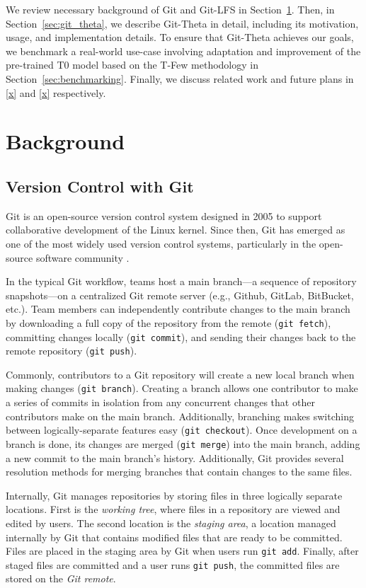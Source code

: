 \documentclass[nohyperref]{article}
\def\code#1{\texttt{#1}}
\theoremstyle{plain}
\theoremstyle{definition}
\theoremstyle{remark}
\begin{document}
We review necessary background of Git and Git-LFS in Section~\cref{sec:background}.
Then, in Section~\cref{sec:git_theta}, we describe Git-Theta in detail, including its motivation, usage, and implementation details.
To ensure that Git-Theta achieves our goals, we benchmark a real-world use-case involving adaptation and improvement of the pre-trained T0 model \citep{sanh2021multitask} based on the T-Few methodology \citep{liu2022tfew} in Section~\cref{sec:benchmarking}.
Finally, we discuss related work and future plans in \cref{x} and \cref{x} respectively.

\section{Background} \label{sec:background}

\subsection{Version Control with Git} \label{ssec:git}

Git is an open-source version control system designed in 2005 to support collaborative development of the Linux kernel. Since then, Git has emerged as one of the most widely used version control systems, particularly in the open-source software community \cite{TODO}.

In the typical Git workflow, teams host a main branch---a sequence of repository snapshots---on a centralized Git remote server (e.g., Github, GitLab, BitBucket, etc.). 
Team members can independently contribute changes to the main branch by downloading a full copy of the repository from the remote (\code{git fetch}), committing changes locally (\code{git commit}), and sending their changes back to the remote repository (\code{git push}).

Commonly, contributors to a Git repository will create a new local branch when making changes (\code{git branch}). Creating a branch allows one contributor to make a series of commits in isolation from any concurrent changes that other contributors make on the main branch. Additionally, branching makes switching between logically-separate features easy (\code{git checkout}). Once development on a branch is done, its changes are merged (\code{git merge}) into the main branch, adding a new commit to the main branch's history. Additionally, Git provides several resolution methods for merging branches that contain changes to the same files. 

Internally, Git manages repositories by storing files in three logically separate locations. First is the \emph{working tree}, where files in a repository are viewed and edited by users. The second location is the \emph{staging area}, a location managed internally by Git that contains modified files that are ready to be committed. Files are placed in the staging area by Git when users run \code{git add}. Finally, after staged files are committed and a user runs \code{git push}, the committed files are stored on the \emph{Git remote}. 
\end{document}
